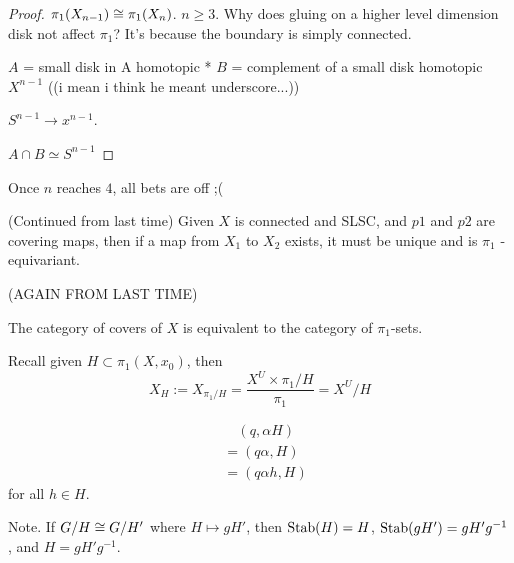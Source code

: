 \documentclass[11pt,leqno,oneside]{amsart}
\newenvironment{dateenv}{
  \vspace{1em}
}{
  \vspace{1em}
}
\newcommand{\mydate}[4]{
  \newdate{#1}{#2}{#3}{#4}
  \begin{dateenv}
    \hfill\displaydate{#1}
  \end{dateenv}
}
\numberwithin{thm}{section}
\newcommand{\homotopic}{\simeq}
\newcommand{\fund}[1][1]{\pi_{#1}}
\newcommand{\x}{\times}
\begin{document}
\begin{proof}
  $\fund(X_{n-1}) \isom \fund(X_n)$.  $n \geq 3$.
  Why does gluing on a higher level dimension disk not affect $\fund$?  It's because the boundary is simply connected.

  $A$ = small disk in A homotopic *
  $B$ = complement of a small disk homotopic $X^{n-1}$ ((i mean i think he meant underscore...))

  $S^{n-1} \to x^{n-1}$.

  $A \cap B \homotopic S^{n-1}$
\end{proof}
\begin{rmk}
  Once $n$ reaches $4$, all bets are off ;(
\end{rmk}



\mydate{d10}{17}{2}{2017}

\begin{thm}
  (Continued from last time) Given $X$ is connected and SLSC, and $p1$ and $p2$ are covering maps, then if a map from $X_1$ to $X_2$ exists, it must be unique and is $\fund$ - equivariant.
\end{thm}


(AGAIN FROM LAST TIME)
\begin{thm}
  The category of covers of $X$ is equivalent to the category of $\fund$-sets.
\end{thm}

Recall given $H \subset \fund(X, x_0)$, then
$$X_H := X_{\fund/H} = \frac{X^U \x \fund/H}{\fund} = X^U/H$$

\begin{align}
  &\quad (q, \alpha H) \\
  &=(q\alpha, H) \\
  &=(q\alpha h, H)
\end{align} for all $h \in H$.

Note.  If $G/H \mathrel{\cong} G/H'$ where $H \mapsto gH'$, then $\operatorname{Stab}(H) = H$, $\operatorname{Stab}(gH') = gH'g^{-1}$, and $H = gH'g^{-1}$.
\end{document}
